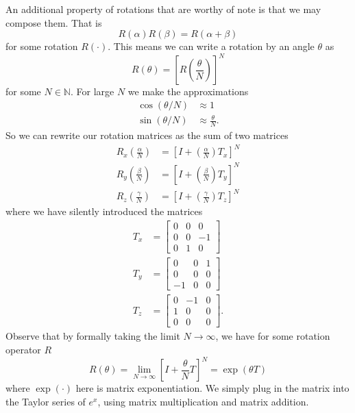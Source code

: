 An additional property of rotations that are worthy of note is
that we may compose them. That is
\begin{equation}
R(\alpha)R(\beta)=R(\alpha+\beta)
\end{equation}
for some rotation $R(\cdot)$. This means we can write a rotation
by an angle $\theta$ as
\begin{equation}
R(\theta) = \left[R\left(\frac{\theta}{N}\right)\right]^{N}
\end{equation}
for some $N\in\mathbb{N}$. For large $N$ we make the
approximations
\begin{subequations}
\begin{align}
\cos(\theta/N)&\approx 1\\
\sin(\theta/N)&\approx \frac{\theta}{N}.
\end{align}
\end{subequations}
So we can rewrite our rotation matrices as the sum of two
matrices
\begin{subequations}
\begin{align}
R_{x}\left(\frac{\alpha}{N}\right) &= \left[I +
\left(\frac{\alpha}{N}\right)T_{x}\right]^{N}\\
R_{y}\left(\frac{\beta}{N}\right) &= \left[I +
\left(\frac{\beta}{N}\right)T_{y}\right]^{N}\\
R_{z}\left(\frac{\gamma}{N}\right) &= \left[I +
\left(\frac{\gamma}{N}\right)T_{z}\right]^{N}
\end{align}
\end{subequations}
where we have silently introduced the matrices
\begin{subequations}
\begin{align}
T_{x} &= \begin{bmatrix}0 & 0 & 0\\
0 & 0 & -1\\
0 & 1 & 0\end{bmatrix}\\
T_{y} &= \begin{bmatrix}0 & 0 & 1\\
0 & 0 & 0\\
-1 & 0 & 0\end{bmatrix}\\
T_{z} &= \begin{bmatrix}0 & -1 & 0\\
1 & 0 & 0\\
0 & 0 & 0\end{bmatrix}.
\end{align}
\end{subequations}
Observe that by formally taking the limit $N\to\infty$, we have
for some rotation operator $R$
\begin{equation}
R(\theta) = \lim_{N\to\infty}\left[I+\frac{\theta}{N}T\right]^{N}=\exp(\theta
T)
\end{equation}
where $\exp(\cdot)$ here is matrix exponentiation. We simply plug
in the matrix into the Taylor series of $e^x$, using matrix
multiplication and matrix addition. 


